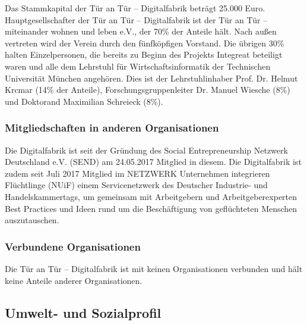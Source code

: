 \documentclass[12pt, a4paper]{article} %
\begin{document}
Das Stammkapital der Tür an Tür – Digitalfabrik beträgt 25.000 Euro.
Hauptgesellschafter der Tür an Tür – Digitalfabrik ist der Tür an Tür –
miteinander wohnen und leben e.V., der 70\% der Anteile hält. Nach außen
vertreten wird der Verein durch den fünfköpfigen Vorstand. Die übrigen
30\% halten Einzelpersonen, die bereits zu Beginn des Projekts Integreat
beteiligt waren und alle dem Lehrstuhl für Wirtschaftsinformatik der
Technischen Universität München angehören. Dies ist der Lehrstuhlinhaber
Prof. Dr. Helmut Krcmar (14\% der Anteile), Forschungsgruppenleiter Dr.
Manuel Wiesche (8\%) und Doktorand Maximilian Schreieck (8\%).

\hypertarget{mitgliedschaften-in-anderen-organisationen}{%
\subsubsection{Mitgliedschaften in anderen
Organisationen}\label{mitgliedschaften-in-anderen-organisationen}}

Die Digitalfabrik ist seit der Gründung des Social Entrepreneurship
Netzwerk Deutschland e.V. (SEND) am 24.05.2017 Mitglied in diesem. Die
Digitalfabrik ist zudem seit Juli 2017 Mitglied im NETZWERK Unternehmen
integrieren Flüchtlinge (NUiF) einem Servicenetzwerk des Deutscher
Industrie- und Handelskammertags, um gemeinsam mit Arbeitgebern und
Arbeitgeberexperten Best Practices und Ideen rund um die Beschäftigung
von geflüchteten Menschen auszutauschen.

\hypertarget{verbundene-organisationen}{%
\subsubsection{Verbundene
Organisationen}\label{verbundene-organisationen}}

Die Tür an Tür – Digitalfabrik ist mit keinen Organisationen verbunden
und hält keine Anteile anderer Organisationen.

\hypertarget{umwelt--und-sozialprofil}{%
\subsection{Umwelt- und
Sozialprofil}\label{umwelt--und-sozialprofil}}
\end{document}
